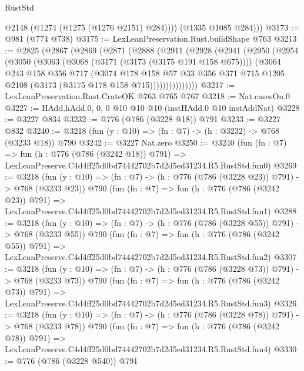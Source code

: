 \begin{lexlean}{RustStd}
\begin{coremodule}
            @2148
            (@1274 (@1275 (@1276 @2151) @284))))
        (@1335 @1085 @284)))
@3173 := @981 (@774 @738)
@3175 := LexLeanPreservation.Rust.buildShape @763
@3213 := @2825
    (@2867
      (@2869
        (@2871
          (@2888
            (@2911
              (@2928
                (@2941
                  (@2950
                    (@2954
                      (@3050
                        (@3063
                          (@3068 (@3171 (@3173 (@3175 @191 @158 @675))))
                          (@3064
                            @243
                            @158
                            @356
                            @717
                            (@3074
                              @178
                              @158
                              @57
                              @33
                              @356
                              @371
                              @715
                              @1205
                              @2108
                              (@3173 (@3175 @178 @158 @715)))))))))))))))
@3217 := LexLeanPreservation.Rust.CrateOK @763 @765 @767
@3218 := Nat.casesOn.{0}
@3227 := HAdd.hAdd.{0, 0, 0} @10 @10 @10 (instHAdd.{0} @10 instAddNat)
@3228 := @3227 @834
@3232 := @776 (@786 (@3228 @18)) @791
@3233 := @3227 @832
@3240 := @3218 (fun (y : @10) => (fn : @7) -> (h : @3232) -> @768 (@3233 @18)) @790
@3242 := @3227 Nat.zero
@3250 := @3240
    (fun (fn : @7) =>
    fun (h : @776 (@786 (@3242 @18)) @791) =>
    LexLeanPreserve.C4d4ff25d0bd74442702b7d2d5ed31234.R5.RustStd.fun0)
@3269 := @3218
    (fun (y : @10) => (fn : @7) -> (h : @776 (@786 (@3228 @23)) @791) -> @768 (@3233 @23))
    @790
    (fun (fn : @7) =>
    fun (h : @776 (@786 (@3242 @23)) @791) =>
    LexLeanPreserve.C4d4ff25d0bd74442702b7d2d5ed31234.R5.RustStd.fun1)
@3288 := @3218
    (fun (y : @10) => (fn : @7) -> (h : @776 (@786 (@3228 @55)) @791) -> @768 (@3233 @55))
    @790
    (fun (fn : @7) =>
    fun (h : @776 (@786 (@3242 @55)) @791) =>
    LexLeanPreserve.C4d4ff25d0bd74442702b7d2d5ed31234.R5.RustStd.fun2)
@3307 := @3218
    (fun (y : @10) => (fn : @7) -> (h : @776 (@786 (@3228 @73)) @791) -> @768 (@3233 @73))
    @790
    (fun (fn : @7) =>
    fun (h : @776 (@786 (@3242 @73)) @791) =>
    LexLeanPreserve.C4d4ff25d0bd74442702b7d2d5ed31234.R5.RustStd.fun3)
@3326 := @3218
    (fun (y : @10) => (fn : @7) -> (h : @776 (@786 (@3228 @78)) @791) -> @768 (@3233 @78))
    @790
    (fun (fn : @7) =>
    fun (h : @776 (@786 (@3242 @78)) @791) =>
    LexLeanPreserve.C4d4ff25d0bd74442702b7d2d5ed31234.R5.RustStd.fun4)
@3330 := @776 (@786 (@3228 @540)) @791

\end{coremodule}
\end{lexlean}
